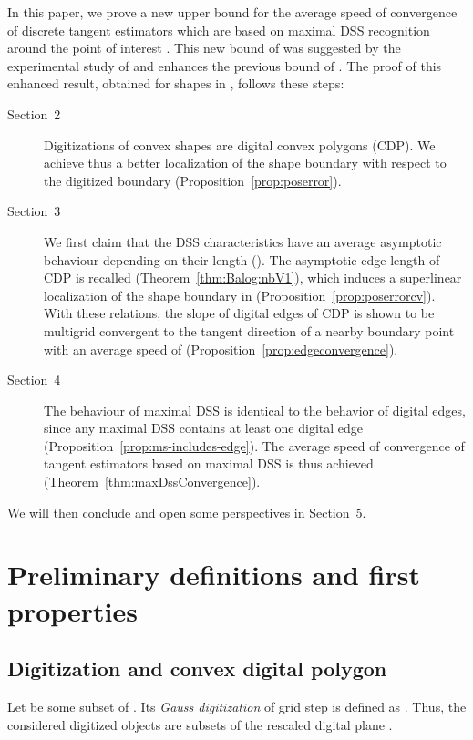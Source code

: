 \documentclass{llncs}
\newcommand{\refProposition}[1]{Proposition~\ref{#1}}
\newcommand{\refTheorem}[1]{Theorem~\ref{#1}}
\begin{document}
In this paper, we prove a new upper bound for the average speed of
convergence of discrete tangent estimators which are based on maximal
DSS recognition around the point of interest
\cite{Feschet99,Lachaud05a}. This new bound of
 was suggested by the experimental study of
\cite{Lachaud05a} and enhances the previous bound of
 \Cite{IVC06}. The proof of this enhanced
result, obtained for shapes in , follows these steps:
\begin{description}
\item[Section~2] Digitizations of convex shapes are digital convex
  polygons (CDP). We achieve thus a better localization of the shape
  boundary with respect to the digitized boundary
  (\refProposition{prop:poserror}).
\item[Section~3] We first claim that the DSS characteristics have an
  average asymptotic behaviour depending on their length
  (). The asymptotic edge length of
  CDP is recalled (\refTheorem{thm:Balog:nbV1}), which induces a
  superlinear localization of the shape boundary in
   (\refProposition{prop:poserrorcv}). With
  these relations, the slope of digital edges of CDP is shown to be
  multigrid convergent to the tangent direction of a nearby boundary
  point with an average speed of 
  (\refProposition{prop:edgeconvergence}).
\item[Section~4] The behaviour of maximal DSS is identical to the
  behavior of digital edges, since any maximal DSS contains at least
  one digital edge (\refProposition{prop:ms-includes-edge}). The
  average speed of convergence of tangent estimators based on
  maximal DSS is thus achieved (\refTheorem{thm:maxDssConvergence}).
\end{description}
We will then conclude and open some perspectives in Section~5.

\section{Preliminary definitions and first properties}

\subsection{Digitization and convex digital polygon}

Let  be some subset of . Its {\em Gauss
digitization} of grid step  is defined as . Thus, the considered digitized
objects are subsets of the rescaled digital plane .
\end{document}
